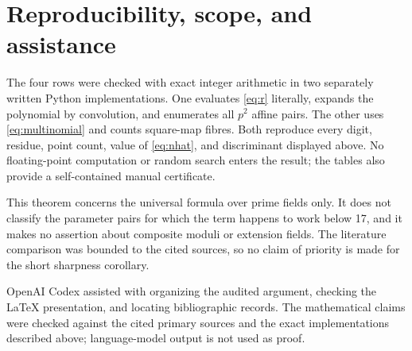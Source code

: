 \documentclass[11pt]{article}
\begin{document}
\section{Reproducibility, scope, and assistance}

The four rows were checked with exact integer arithmetic in two separately
written Python implementations.  One evaluates \eqref{eq:r} literally,
expands the polynomial by convolution, and enumerates all \(p^2\) affine
pairs.  The other uses \eqref{eq:multinomial} and counts square-map fibres.
Both reproduce every digit, residue, point count, value of \eqref{eq:nhat},
and discriminant displayed above.  No floating-point computation or random
search enters the result; the tables also provide a self-contained manual
certificate.

This theorem concerns the universal formula over prime fields only.  It does
not classify the parameter pairs for which the term happens to work below
17, and it makes no assertion about composite moduli or extension fields.
The literature comparison was bounded to the cited sources, so no claim of
priority is made for the short sharpness corollary.

OpenAI Codex assisted with organizing the audited argument, checking the
LaTeX presentation, and locating bibliographic records.  The mathematical
claims were checked against the cited primary sources and the exact
implementations described above; language-model output is not used as proof.



\end{document}
